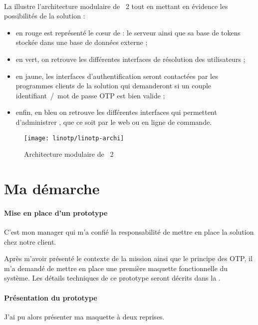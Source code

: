 \paragraph{}
La  illustre l'architecture modulaire de \alinotp{}~2 tout en mettant en évidence les possibilités de la solution :

\begin{itemize}
	\item en rouge est représenté le c\oe ur de \alinotp{} : le serveur ainsi que sa base de tokens stockée dans une base de données externe ;
	\item en vert, on retrouve les différentes interfaces de résolution des utilisateurs ;
	\item en jaune, les interfaces d'authentification seront contactées par les programmes clients de la solution qui demanderont si un couple identifiant~/~mot de passe OTP est bien valide ;
	\item enfin, en bleu on retrouve les différentes interfaces qui permettent d'administrer \alinotp{}, que ce soit par le web ou en ligne de commande.
\end{itemize}

\begin{figure}
	\centering
	\texttt{[image: linotp/linotp-archi]}
	\caption{Architecture modulaire de \alinotp{}~2}
	\label{figure:linotp:linotp-archi}
\end{figure}


\section{Ma démarche}

\paragraph{Mise en place d'un prototype}
C'est mon manager \apakou{} qui m'a confié la responsabilité de mettre en place la solution \alinotp{} chez notre client.

Après m'avoir présenté le contexte de la mission ainsi que le principe des OTP, il m'a demandé de mettre en place une première maquette fonctionnelle du système.
Les détails techniques de ce prototype seront décrits dans la .

\paragraph{Présentation du prototype}
J'ai pu alors présenter ma maquette à deux reprises.

